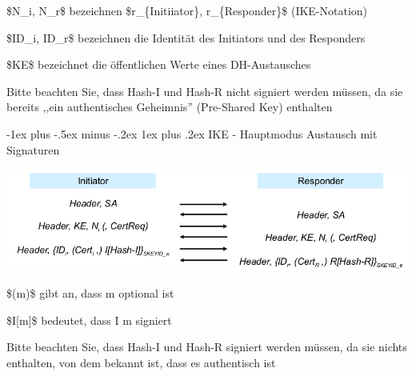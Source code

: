 \documentclass[a4paper]{article}
\makeatletter
\renewcommand{\subsubsection}{\@startsection{subsubsection}{3}{0mm}%
 {-1ex plus -.5ex minus -.2ex}%
 {1ex plus .2ex}%
 {\normalfont\small\bfseries}}
\makeatother
\begin{document}
\begin{multicols}{3}
\begin{itemize*}
\begin{itemize*}
                  \begin{itemize*}
                        \item \$N\_i, N\_r\$ bezeichnen \$r\_\{Initiiator\}, r\_\{Responder\}\$ (IKE-Notation)
                        \item \$ID\_i, ID\_r\$ bezeichnen die Identität des Initiators und des Responders
                        \item \$KE\$ bezeichnet die öffentlichen Werte eines DH-Austausches
                  \end{itemize*}
                  \item
                  Bitte beachten Sie, dass Hash-I und Hash-R nicht signiert werden
                  müssen, da sie bereits ,,ein authentisches Geheimnis'' (Pre-Shared
                  Key) enthalten
            \end{itemize*}


            \subsubsection{IKE - Hauptmodus Austausch mit
                  Signaturen}

            \begin{itemize*}
                  \item \includegraphics[width=\linewidth]{Assets/NetworkSecurity-IKE-exchange-payload-signature.png}
                  \begin{itemize*}
                        \item \$(m)\$ gibt an, dass m optional ist
                        \item \$I{[}m{]}\$ bedeutet, dass I m signiert
                  \end{itemize*}
                  \item Bitte beachten Sie, dass Hash-I und Hash-R signiert werden müssen, da sie nichts enthalten, von dem bekannt ist, dass es authentisch ist
            \end{itemize*}



\end{itemize*}
\end{multicols}
\end{document}
